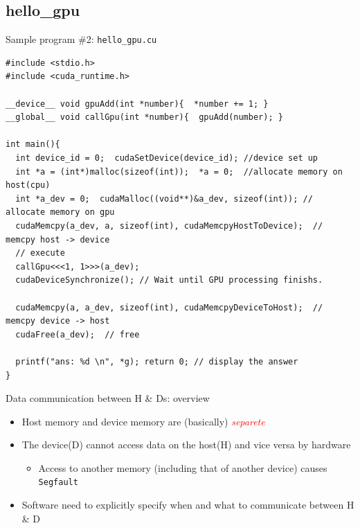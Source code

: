\documentclass[dvipdfmx, 11pt, aspectratio=169]{beamer}   %
\begin{document}
\subsection{hello\_gpu}
\begin{frame}[fragile]{Sample program \#2: \texttt{hello\_gpu.cu}}
\begin{block}{}\vspace{-\baselineskip}
  \begin{lstlisting}[language=CUDA, basicstyle=\ttfamily\tiny]
#include <stdio.h>
#include <cuda_runtime.h>

__device__ void gpuAdd(int *number){  *number += 1; }
__global__ void callGpu(int *number){  gpuAdd(number); }

int main(){
  int device_id = 0;  cudaSetDevice(device_id); //device set up
  int *a = (int*)malloc(sizeof(int));  *a = 0;  //allocate memory on host(cpu)
  int *a_dev = 0;  cudaMalloc((void**)&a_dev, sizeof(int)); // allocate memory on gpu
  cudaMemcpy(a_dev, a, sizeof(int), cudaMemcpyHostToDevice);  // memcpy host -> device
  // execute
  callGpu<<<1, 1>>>(a_dev);
  cudaDeviceSynchronize(); // Wait until GPU processing finishs.
  
  cudaMemcpy(a, a_dev, sizeof(int), cudaMemcpyDeviceToHost);  // memcpy device -> host 
  cudaFree(a_dev);  // free

  printf("ans: %d \n", *g); return 0; // display the answer
}
\end{lstlisting}
\end{block}
\end{frame}
\begin{frame}{Data communication between H \& Ds: overview}
  \begin{itemize}
    \item Host memory and device memory are (basically) \textcolor{red}{\textit{separete}}
    \item The device(D) cannot access data on the host(H) and vice versa by hardware
    \begin{itemize}
      \item Access to another memory (including that of another device) causes \lstinline|Segfault|
    \end{itemize}
    \item Software need to explicitly specify when and what to communicate between H \& D
  \end{itemize}
\end{frame}
\end{document}
